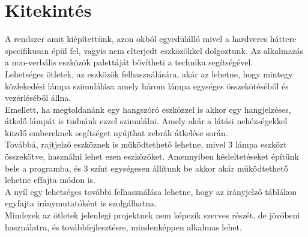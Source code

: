 \documentclass[tocnopagenum]{thesis-ekf}
\theoremstyle{definition}
\theoremstyle{remark}
\begin{document}
	\chapter*{Kitekintés}
	A rendszer amit kiépítettünk, azon okból egyedülálló mivel a hardveres háttere specifikusan épül fel, vagyis nem elterjedt eszközökkel dolgoztunk. Az alkalmazás a non-verbális eszközök palettáját bővítheti a technika segítségével. 
	\\
	Lehetséges ötletek, az eszközök felhasználására, akár az lehetne, hogy mintegy közlekedési lámpa szimulálása amely három lámpa egységes összekötéséből és vezérléséből állna. 
	\\
	Emellett, ha megtoldanánk egy hangszóró eszközzel is akkor egy hangjelzéses, átkelő lámpát is tudnánk ezzel szimulálni. Amely akár a látási nehézségekkel küzdő embereknek segítséget nyújthat zebrák átkelése során.
	\\
	Továbbá, rajtjelző eszköznek is működtethető lehetne, mivel 3 lámpa eszközt összekötve, használni lehet ezen eszközöket. Amennyiben késleltetéseket építünk bele a programba, és 3 színt egységesen állítunk be akkor akár működtethető lehetne effajta módon is. 
	\\
	A nyíl egy lehetséges további felhasználása lehetne, hogy az irányjelző táblákon egyfajta iránymutatóként is szolgálhatna.
	\\
	Mindezek az ötletek jelenlegi projektnek nem képezik szerves részét, de jövőbeni használatra, és továbbfejlesztésre, mindenképpen alkalmas lehet.
	
	
	

\end{document}
